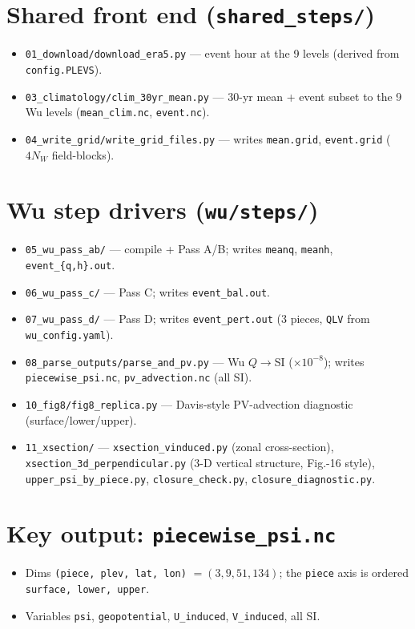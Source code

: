 \section{Shared front end (\texttt{shared\_steps/})}
\begin{itemize}\setlength\itemsep{0pt}
\item \texttt{01\_download/download\_era5.py} --- event hour at the 9
      levels (derived from \texttt{config.PLEVS}).
\item \texttt{03\_climatology/clim\_30yr\_mean.py} --- 30-yr mean +
      event subset to the 9 Wu levels (\texttt{mean\_clim.nc},
      \texttt{event.nc}).
\item \texttt{04\_write\_grid/write\_grid\_files.py} --- writes
      \texttt{mean.grid}, \texttt{event.grid} ($4N_W$ field-blocks).
\end{itemize}

\section{Wu step drivers (\texttt{wu/steps/})}
\begin{itemize}\setlength\itemsep{0pt}
\item \texttt{05\_wu\_pass\_ab/} --- compile + Pass A/B; writes
      \texttt{meanq}, \texttt{meanh}, \texttt{event\_\{q,h\}.out}.
\item \texttt{06\_wu\_pass\_c/} --- Pass C; writes \texttt{event\_bal.out}.
\item \texttt{07\_wu\_pass\_d/} --- Pass D; writes \texttt{event\_pert.out}
      (3 pieces, \texttt{QLV} from \texttt{wu\_config.yaml}).
\item \texttt{08\_parse\_outputs/parse\_and\_pv.py} --- Wu $Q\to$SI
      ($\times10^{-8}$); writes \texttt{piecewise\_psi.nc},
      \texttt{pv\_advection.nc} (all SI).
\item \texttt{10\_fig8/fig8\_replica.py} --- Davis-style PV-advection
      diagnostic (surface/lower/upper).
\item \texttt{11\_xsection/} --- \texttt{xsection\_vinduced.py} (zonal
      cross-section), \texttt{xsection\_3d\_perpendicular.py} (3-D
      vertical structure, Fig.-16 style), \texttt{upper\_psi\_by\_piece.py},
      \texttt{closure\_check.py}, \texttt{closure\_diagnostic.py}.
\end{itemize}

\section{Key output: \texttt{piecewise\_psi.nc}}
\begin{itemize}\setlength\itemsep{0pt}
\item Dims \texttt{(piece, plev, lat, lon)} $=(3, 9, 51, 134)$; the
      \texttt{piece} axis is ordered \texttt{surface, lower, upper}.
\item Variables \texttt{psi}, \texttt{geopotential}, \texttt{U\_induced},
      \texttt{V\_induced}, all SI.
\end{itemize}

